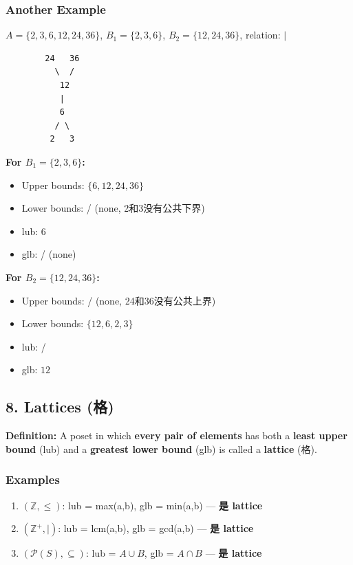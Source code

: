\documentclass[10pt,a4paper,openany]{ctexbook}
\theoremstyle{definition}
\theoremstyle{remark}
\begin{document}
\subsubsection{Another Example}

$A = \{2,3,6,12,24,36\}$, $B_1 = \{2,3,6\}$, $B_2 = \{12,24,36\}$, relation: $|$
{\footnotesize\begin{verbatim}
        24   36
          \  /
           12
           |
           6
          / \
         2   3
\end{verbatim}}

\textbf{For $B_1 = \{2,3,6\}$:}
\begin{itemize}
\item Upper bounds: $\{6, 12, 24, 36\}$
\item Lower bounds: / (none, 2和3没有公共下界)
\item lub: $6$
\item glb: / (none)

\end{itemize}

\textbf{For $B_2 = \{12,24,36\}$:}
\begin{itemize}
\item Upper bounds: / (none, 24和36没有公共上界)
\item Lower bounds: $\{12, 6, 2, 3\}$
\item lub: /
\item glb: $12$

\end{itemize}

\vspace{-2pt}

\subsection{8. Lattices (格)}

\textbf{Definition:} A poset in which \textbf{every pair of elements} has both a \textbf{least upper bound} (lub) and a \textbf{greatest lower bound} (glb) is called a \textbf{lattice} (格).
\subsubsection{Examples}

\begin{enumerate}
\item \textbf{$(\mathbb{Z}, \le)$}: lub = max(a,b), glb = min(a,b) — \textbf{是 lattice}
\item \textbf{$(\mathbb{Z}^+, \mid)$}: lub = lcm(a,b), glb = gcd(a,b) — \textbf{是 lattice}
\item \textbf{$(\mathcal{P}(S), \subseteq)$}: lub = $A \cup B$, glb = $A \cap B$ — \textbf{是 lattice}

\end{enumerate}
\end{document}
